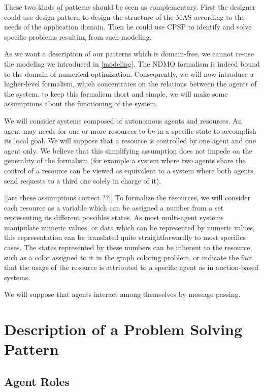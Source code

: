 These two kinds of patterns should be seen as complementary. First the designer could use design pattern to design the structure of the MAS according to the needs of the application domain. Then he could use CPSP to identify and solve specific problems resulting from such modeling.

As we want a description of our patterns which is domain-free, we cannot re-use the modeling we introduced in \ref{modeling}. The NDMO formalism is indeed bound to the domain of numerical optimization. Consequently, we will now introduce a higher-level formalism, which concentrates on the relations between the agents of the system. to keep this formalism short and simple, we will make some assumptions about the functioning of the system.

We will consider systems composed of autonomous agents and resources. An agent may needs for one or more resources to be in a specific state to accomplish its local goal. We will suppose that a resource is controlled by one agent and one agent only. We believe that this simplifying assumption does not impede on the generality of the formalism (for example a system where two agents share the control of a resource can be viewed as equivalent to a system where both agents send requests to a third one solely in charge of it).

[[are these assumptions correct ??]]
To formalize the resources, we will consider each resource as a variable which can be assigned a number from a set representing its different possibles states. As most multi-agent systems manipulate numeric values, or data which can be represented by numeric values, this representation can be translated quite straightforwardly to most specifics cases.
The states represented by these numbers can be inherent to the resource, such as a color assigned to it in the graph coloring problem, or indicate the fact that the usage of the resource is attributed to a specific agent as in auction-based systems.

We will suppose that agents interact among themselves by message passing.

\section{Description of a Problem Solving Pattern}

\subsection{Agent Roles}


